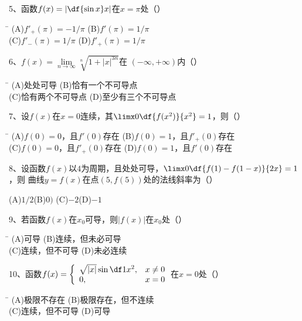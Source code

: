 \bigskip

5、函数$f(x)=\left|\df{\sin x}x\right|$在$x=\pi$处（\quad）%
\begin{tabbing}
	\hspace{8cm}\=\kill
	\quad\quad\quad(A)\;$f'_+(\pi)=-1/\pi$ \> 
	(B)\;$f'(\pi)=1/\pi$ \\ 
	\quad\quad\quad(C)\;$f'_-(\pi)=1/\pi$\>
	(D)\;$f'_+(\pi)=1/\pi$
\end{tabbing}

\bigskip

6、$f(x)=\lim\limits_{n\to\infty}\sqrt[n]{1+|x|^{3n}}$在
$(-\infty,+\infty)$内（\quad）%
\begin{tabbing}
	\hspace{8cm}\=\kill
	\quad\quad\quad(A)\;处处可导 \> 
	(B)\;恰有一个不可导点 \\ 
	\quad\quad\quad(C)\;恰有两个不可导点\>
	(D)\;至少有三个不可导点
\end{tabbing}

\bigskip

7、设$f(x)$在$x=0$连续，其$\limx0\df{f(x^2)}{x^2}=1$，则（\quad）%
\begin{tabbing}
	\hspace{8cm}\=\kill
	\quad\quad\quad(A)\;$f(0)=0$，且$f'(0)$存在 \> 
	(B)\;$f(0)=1$，且$f'_+(0)$存在 \\ 
	\quad\quad\quad(C)\;$f(0)=0$，且$f'_+(0)$存在\>
	(D)\;$f(0)=1$，且$f'(0)$存在
\end{tabbing}

\bigskip

8、设函数$f(x)$以$4$为周期，且处处可导，$\limx0\df{f(1)-f(1-x)}{2x}=1$，则
曲线$y=f(x)$在点$(5,f(5))$处的法线斜率为（\quad）%

\quad (A)\;$1/2$\quad\quad\quad(B)\;$0)$
\quad\quad\quad (C)\;$-2$\quad\quad\quad(D)\;$-1$

\bigskip

9、若函数$f(x)$在$x_0$可导，则$|f(x)|$在$x_0$处（\quad）%
\begin{tabbing}
	\hspace{8cm}\=\kill
	\quad\quad\quad(A)\;可导 \> 
	(B)\;连续，但未必可导 \\ 
	\quad\quad\quad(C)\;连续，但不可导\>
	(D)\;未必连续
\end{tabbing}

\bigskip

10、函数$f(x)=\left\{\begin{array}{ll}
\sqrt{|x|}\sin\df1{x^2},& x\ne 0\\
0,& x=0
\end{array}\right.$在$x=0$处（\quad）%
\begin{tabbing}
	\hspace{8cm}\=\kill
	\quad\quad\quad(A)\;极限不存在 \> 
	(B)\;极限存在，但不连续 \\ 
	\quad\quad\quad(C)\;连续，但不可导\>
	(D)\;可导
\end{tabbing}

